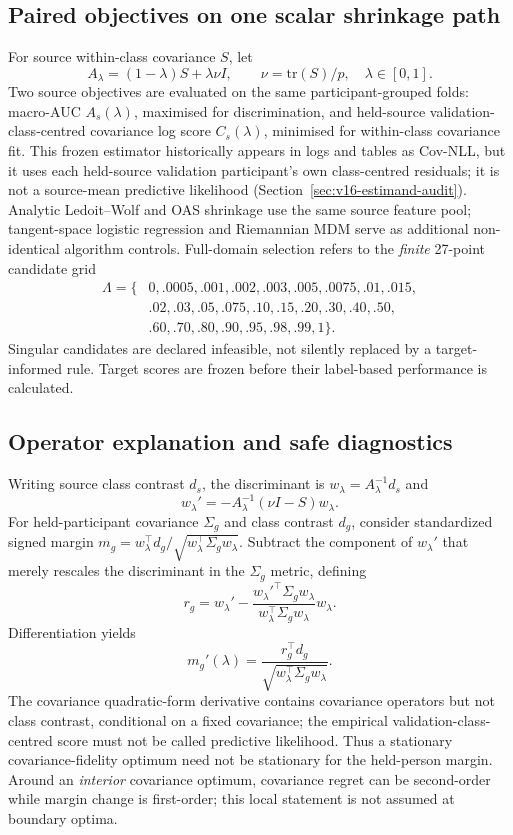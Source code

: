 \documentclass[11pt,a4paper]{article}
\begin{document}
\subsection{Paired objectives on one scalar shrinkage path}
For source within-class covariance \(S\), let
\[
 A_\lambda=(1-\lambda)S+\lambda\nu I,\qquad
 \nu=\mathrm{tr}(S)/p,\quad \lambda\in[0,1].
\]
Two source objectives are evaluated on the same participant-grouped folds:
macro-AUC \(A_s(\lambda)\), maximised for discrimination, and held-source validation-class-centred covariance log score
\(C_s(\lambda)\), minimised for within-class covariance fit.
This frozen estimator historically appears in logs and tables as
Cov-NLL, but it uses each held-source validation participant's own
class-centred residuals; it is not a source-mean predictive likelihood
(Section~\ref{sec:v16-estimand-audit}). Analytic Ledoit--Wolf and OAS shrinkage use the same
source feature pool; tangent-space logistic regression and Riemannian
MDM serve as additional non-identical algorithm controls. Full-domain
selection refers to the \emph{finite} 27-point candidate grid
\[
\begin{aligned}
\Lambda=\{&0,.0005,.001,.002,.003,.005,.0075,.01,.015,\\
&.02,.03,.05,.075,.10,.15,.20,.30,.40,.50,\\
&.60,.70,.80,.90,.95,.98,.99,1\}.
\end{aligned}
\]
Singular candidates are declared infeasible, not silently replaced by
a target-informed rule. Target scores are frozen before their
label-based performance is calculated.





\subsection{Operator explanation and safe diagnostics}
Writing source class contrast \(d_s\), the discriminant is
\(w_\lambda=A_\lambda^{-1}d_s\) and
\[
 w_\lambda'=-A_\lambda^{-1}(\nu I-S)w_\lambda.
\]
For held-participant covariance \(\Sigma_g\) and class contrast \(d_g\),
consider standardized signed margin
\(m_g=w_\lambda^\top d_g/\sqrt{w_\lambda^\top\Sigma_gw_\lambda}\).
Subtract the component of \(w_\lambda'\) that merely rescales the
discriminant in the \(\Sigma_g\) metric, defining
\[
 r_g=w_\lambda'-
 \frac{w_\lambda'^\top\Sigma_gw_\lambda}
 {w_\lambda^\top\Sigma_gw_\lambda}w_\lambda.
\]
Differentiation yields
\[
 m_g'(\lambda)=
 \frac{r_g^\top d_g}{\sqrt{w_\lambda^\top\Sigma_gw_\lambda}}.
\]
The covariance quadratic-form derivative contains covariance operators but
not class contrast, conditional on a fixed covariance; the empirical
validation-class-centred score must not be called predictive likelihood. Thus a stationary covariance-fidelity optimum need not
be stationary for the held-person margin. Around an \emph{interior} covariance
optimum, covariance regret can be second-order while margin change is
first-order; this local statement is not assumed at boundary optima.
\end{document}
